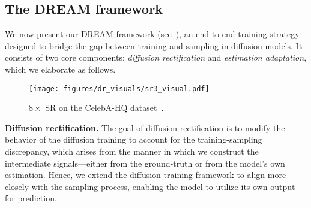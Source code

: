 
\subsection{The DREAM framework} \label{subsec:3.3}



We now present our DREAM framework (see~), an end-to-end training strategy designed to bridge the gap between training and sampling in diffusion models. It consists of two core components: \emph{diffusion rectification} and \emph{estimation adaptation}, which we elaborate as follows.

\begin{figure}
    \centering
    \texttt{[image: figures/dr\_visuals/sr3\_visual.pdf]}
    \vspace{-.1in}
    \caption{
    $8\times$ SR on the CelebA-HQ dataset~\cite{karras2017progressive}.} 
        \label{fig:drm-visual}
    \vspace{-.1in}
\end{figure}


\textbf{Diffusion rectification.} The goal of diffusion rectification is to modify the behavior of the diffusion training to account for the training-sampling discrepancy, which arises from the manner in which we construct the intermediate signals---either from the ground-truth or from the model's own estimation.  Hence, we extend the diffusion training framework to align more closely with the sampling process, enabling the model to utilize its own output for prediction.

